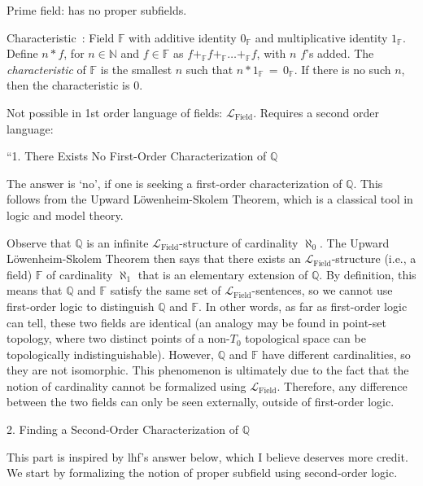 Prime field: has no proper subfields.

Characteristic~\cite{wiki:Field_mathematics}: 
Field $\mathbb{F}$ with additive identity $0_{\mathbb{F}}$
and multiplicative identity $1_{\mathbb{F}}$.
Define $n \ast f$, for $n \in \mathbb{N}$ and $f \in \mathbb{F}$
as $f +_{\mathbb{F}} f +_{\mathbb{F}} \ldots +_{\mathbb{F}} f$, 
with $n$ $f$'s added.
The \textit{characteristic} of $\mathbb{F}$
is the smallest $n$ such that 
$n \ast 1_{\mathbb{F}} \,=\, 0_{\mathbb{F}}$.
If there is no such $n$, then the characteristic is 
$0$.


Not possible in 1st order language of fields:
$ \mathcal{L}_{\text{Field}} $.
Requires a second order language:


``1. There Exists No First-Order Characterization of $ \mathbb{Q} $

The answer is ‘no’, if one is seeking a first-order 
characterization of $ \mathbb{Q} $. 
This follows from the Upward Löwenheim-Skolem Theorem, 
which is a classical tool in logic and model theory.

Observe that $ \mathbb{Q} $ is an infinite 
$ \mathcal{L}_{\text{Field}} $-structure 
of cardinality $ \aleph_{0} $. 
The Upward L\"{o}wenheim-Skolem Theorem then says that 
there exists an $ \mathcal{L}_{\text{Field}} $-structure 
(i.e., a field) $ \mathbb{F} $ of cardinality $ \aleph_{1} $ 
that is an elementary extension of $ \mathbb{Q} $. 
By definition, this means that $ \mathbb{Q} $ and $ \mathbb{F} $ 
satisfy the same set of $ \mathcal{L}_{\text{Field}} $-sentences, 
so we cannot use first-order logic to distinguish $ \mathbb{Q} $ 
and $ \mathbb{F} $. In other words, as far as first-order logic 
can tell, these two fields are identical
(an analogy may be found in point-set topology,
where two distinct points of a non-$ T_{0} $ topological space 
can be topologically indistinguishable). 
However, $ \mathbb{Q} $ and $ \mathbb{F} $ have different 
cardinalities, so they are not isomorphic. 
This phenomenon is ultimately due to the fact 
that the notion of cardinality cannot be formalized
 using $ \mathcal{L}_{\text{Field}} $. 
 Therefore, any difference between the two fields 
 can only be seen externally, outside of first-order logic.

2. Finding a Second-Order Characterization of $ \mathbb{Q} $

This part is inspired by lhf's answer below, 
which I believe deserves more credit. 
We start by formalizing the notion of proper subfield 
using second-order logic.

